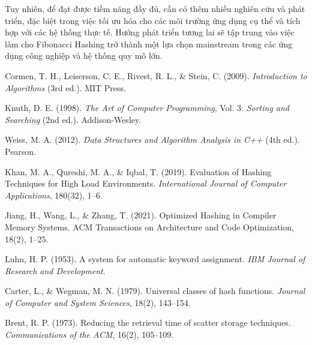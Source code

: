 \documentclass[12pt,a4paper]{report}
\begin{document}
Tuy nhiên, để đạt được tiềm năng đầy đủ, cần có thêm nhiều nghiên cứu và phát triển, đặc biệt trong việc tối ưu hóa cho các môi trường ứng dụng cụ thể và tích hợp với các hệ thống thực tế. Hướng phát triển tương lai sẽ tập trung vào việc làm cho Fibonacci Hashing trở thành một lựa chọn mainstream trong các ứng dụng công nghiệp và hệ thống quy mô lớn.
\newpage
{}
{}
\begin{thebibliography}{9}

Cormen, T. H., Leiserson, C. E., Rivest, R. L., \& Stein, C. (2009). \textit{Introduction to Algorithms} (3rd ed.). MIT Press.

Knuth, D. E. (1998). \textit{The Art of Computer Programming}, Vol. 3: \textit{Sorting and Searching} (2nd ed.). Addison-Wesley.

Weiss, M. A. (2012). \textit{Data Structures and Algorithm Analysis in C++} (4th ed.). Pearson.

Khan, M. A., Qureshi, M. A., \& Iqbal, T. (2019). Evaluation of Hashing Techniques for High Load Environments. \textit{International Journal of Computer Applications}, 180(32), 1–6.

Jiang, H., Wang, L., \& Zhang, T. (2021). Optimized Hashing in Compiler Memory Systems. ACM Transactions on Architecture and Code Optimization, 18(2), 1–25.

Luhn, H. P. (1953). A system for automatic keyword assignment. \textit{IBM Journal of Research and Development}.

Carter, L., \& Wegman, M. N. (1979). Universal classes of hash functions. \textit{Journal of Computer and System Sciences}, 18(2), 143–154.

Brent, R. P. (1973). Reducing the retrieval time of scatter storage techniques. \textit{Communications of the ACM}, 16(2), 105–109.

\end{thebibliography}
\end{document}
